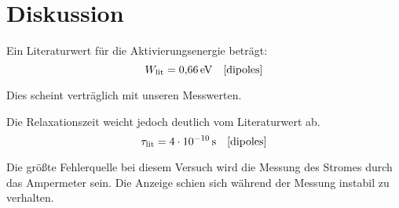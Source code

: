 \section{Diskussion}\label{sec:Diskussion}


Ein Literaturwert für die Aktivierungsenergie beträgt:
\begin{equation}
  W_\text{lit} = \SI{0.66}{\electronvolt} \quad \text{\cite{dipoles}}
\end{equation}

Dies scheint verträglich mit unseren Messwerten.

Die Relaxationszeit weicht jedoch deutlich vom Literaturwert ab.
\begin{equation}
  \tau_\text{lit} = \SI{4E-10}{\second} \quad \text{\cite{dipoles}}
\end{equation}

Die größte Fehlerquelle bei diesem Versuch wird die Messung des Stromes durch das
Ampermeter sein. Die Anzeige schien sich während der Messung instabil zu verhalten. 
